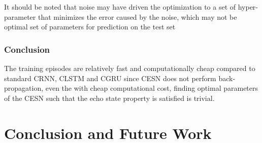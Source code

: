 \documentclass{WitsPhysicsReport}
\begin{document}
It should be noted that noise may  have driven the optimization to a set of hyper-parameter that minimizes the error caused by the noise, which  may not be 
optimal set of parameters for prediction on the test set

\subsubsection{Conclusion}
The training episodes are relatively fast and computationally cheap compared to standard CRNN, CLSTM and CGRU since CESN does not perform back-propagation, even the with cheap computational cost, finding optimal parameters of the CESN such that the echo state property is satisfied is trivial.

\newpage


\section{Conclusion and Future Work}
\label{sec:Discussion_and_Conclusion}



\end{document}

